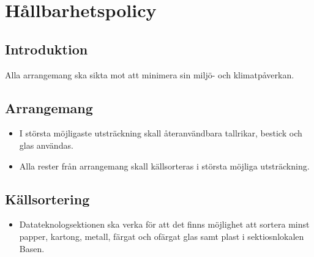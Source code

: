 \section{Hållbarhetspolicy}

\subsection{Introduktion}
Alla arrangemang ska sikta mot att minimera sin miljö- och klimatpåverkan.

\subsection{Arrangemang}

\begin{itemize}
    \item I största möjligaste utsträckning skall återanvändbara tallrikar, bestick och glas användas.
    \item Alla rester från arrangemang skall källsorteras i största möjliga utsträckning.
\end{itemize}


\subsection{Källsortering}

\begin{itemize}
    \item Datateknologsektionen ska verka för att det finns möjlighet att sortera minst papper, kartong, metall, färgat och ofärgat glas samt plast i sektiosnlokalen Basen. 
\end{itemize}


